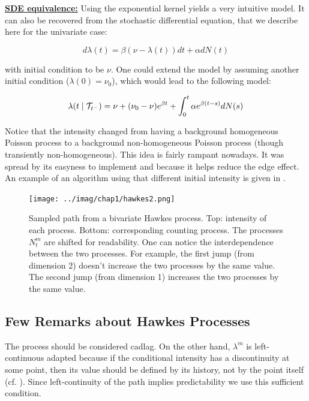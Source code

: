 \documentclass[11pt]{book}
\begin{document}
\underline{\textbf{SDE equivalence:}} Using the exponential kernel yields a very intuitive model. It can also be recovered from the stochastic differential equation, that we describe here for the univariate case:

$$ d \lambda (t) = \beta ( \nu - \lambda (t) ) dt + \alpha d N(t) $$

with initial condition to be $\nu$. One could extend the model by assuming another initial condition ($\lambda( 0 ) = \nu_0$), which would lead to the following model:

$$ \lambda(t \mid  \mathcal{T}_{t^-} ) = \nu +  ( \nu_0 - \nu )  e^{\beta t } +  \int_0^t \alpha e^{\beta ( t -s ) } d N(s) $$

Notice that the intensity changed from having a background homogeneous Poisson process to a background non-homogeneous Poisson process (though transiently non-homogeneous). This idea is fairly rampant nowadays. It was spread by its easyness to implement and because it helps reduce the edge effect. An example of an algorithm using that different initial intensity is given in \cite{simuldassios}.
\label{section:dassios}




\begin{figure}
\centering
\texttt{[image: ../imag/chap1/hawkes2.png]}
\caption{Sampled path from a bivariate Hawkes process. Top: intensity of each process. Bottom: corresponding counting process. The processes $N_t^m$ are shifted for readability. One can notice the interdependence between the two processes. For example, the first jump (from dimension 2) doesn't increase the two processes by the same value. The second jump (from dimension 1) increases the two processes by the same value.}
\label{fig:hawkes2}
\end{figure}


\subsection{Few Remarks about Hawkes Processes}
\begin{remarque}
The process should be considered cadlag. On the other hand, $\lambda^m$ is left-continuous adapted because if the conditional intensity has a discontinuity at some point, then its value should be defined by its history, not by the point itself (cf. \cite{daley}). Since left-continuity of the path implies predictability we use this sufficient condition. 
\end{remarque}
\end{document}
